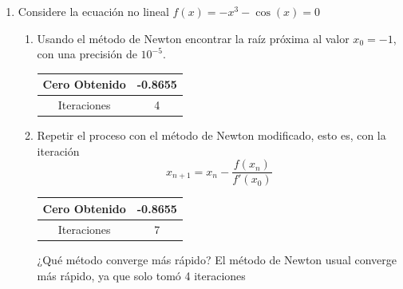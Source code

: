 \documentclass{udparticle}
\begin{document}
\begin{enumerate}
\begin{enumerate}
\begin{enumerate}
        \end{enumerate}
        
    \end{enumerate}
		

\item Considere la ecuación no lineal $f(x) = -x^{3} - \cos(x) = 0$
    \begin{enumerate}
    
        \item Usando el método de Newton encontrar la raíz próxima al valor $x_{0}=-1$, con una precisión de $10^{-5}$.\\
        \begin{table}[H]
        \centering
        \begin{tabular} { |c|c|}
        
        \hline
        Cero Obtenido &  -0.8655\\
        \hline
        Iteraciones   &    4\\
        \hline
        
        \end{tabular}
        \end{table}
        
        \item Repetir el proceso con el método de Newton modificado, esto es, con la iteración $$x_{n+1} = x_{n} - \frac {f(x_{n})} {f'(x_{0})} $$
        \begin{table}[H]
        \centering
        \begin{tabular} { |c|c|}
        
        \hline
        Cero Obtenido &  -0.8655\\
        \hline
        Iteraciones   &    7\\
        \hline
        
        \end{tabular}
        \end{table}
        ¿Qué método converge más rápido?
        El método de Newton usual converge más rápido, ya que solo tomó 4 iteraciones %
    \end{enumerate}


\end{enumerate}
\end{document}
